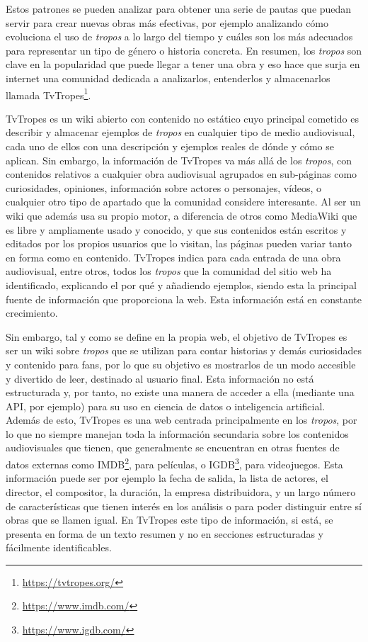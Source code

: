 Estos patrones se pueden analizar para obtener una serie de pautas que puedan
servir para crear nuevas obras más efectivas, por ejemplo analizando cómo
evoluciona el uso de \textit{tropos} a lo largo del tiempo y cuáles son los más
adecuados para representar un tipo de género o historia concreta. En resumen,
los \textit{tropos} son clave en la popularidad que puede llegar a tener una
obra y eso hace que surja en internet una comunidad dedicada a analizarlos,
entenderlos y almacenarlos llamada
TvTropes\footnote{\url{https://tvtropes.org/}}. 

TvTropes es un wiki abierto con contenido no estático cuyo principal cometido es
describir y almacenar ejemplos de \textit{tropos} en cualquier tipo de medio
audiovisual, cada uno de ellos con una descripción y ejemplos reales de dónde y
cómo se aplican. Sin embargo, la información de TvTropes va más allá de los
\textit{tropos}, con contenidos relativos a cualquier obra audiovisual agrupados
en sub-páginas como curiosidades, opiniones, información sobre actores o
personajes, vídeos, o cualquier otro tipo de apartado que la comunidad considere
interesante. Al ser un wiki que además usa su propio motor, a diferencia de
otros como MediaWiki que es libre y ampliamente usado y conocido, y que sus
contenidos están escritos y editados por los propios usuarios que lo visitan,
las páginas pueden variar tanto en forma como en contenido. TvTropes indica para
cada entrada de una obra audiovisual, entre otros, todos los \textit{tropos} que
la comunidad del sitio web ha identificado, explicando el por qué y añadiendo
ejemplos, siendo esta la principal fuente de información que proporciona la web.
Esta información está en constante crecimiento.

Sin embargo, tal y como se define en la propia web, el objetivo de TvTropes es
ser un wiki sobre \textit{tropos} que se utilizan para contar historias y demás
curiosidades y contenido para fans, por lo que su objetivo es mostrarlos de un
modo accesible y divertido de leer, destinado al usuario final. Esta información
no está estructurada y, por tanto, no existe una manera de acceder a ella
(mediante una API, por ejemplo) para su uso en ciencia de datos o inteligencia
artificial. Además de esto, TvTropes es una web centrada principalmente en los
\textit{tropos}, por lo que no siempre manejan toda la información secundaria
sobre los contenidos audiovisuales que tienen, que generalmente se encuentran en
otras fuentes de datos externas como IMDB\footnote{\url{https://www.imdb.com/}},
para películas, o IGDB\footnote{\url{https://www.igdb.com/}}, para videojuegos.
Esta información puede ser por ejemplo la fecha de salida, la lista de actores,
el director, el compositor, la duración, la empresa distribuidora, y un largo
número de características que tienen interés en los análisis o para poder
distinguir entre sí obras que se llamen igual. En TvTropes este tipo de
información, si está, se presenta en forma de un texto resumen y no en secciones
estructuradas y fácilmente identificables.

